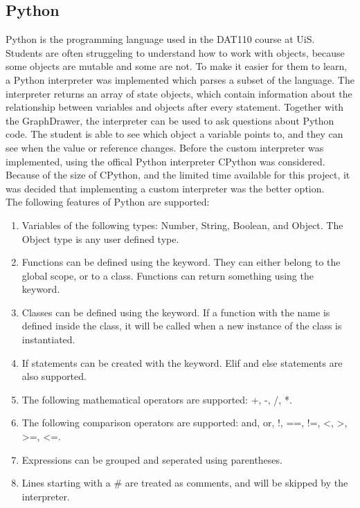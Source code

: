 \subsection{Python}
Python is the programming language used in the DAT110 course at UiS. Students are often struggeling to understand how to work with objects, because some objects are mutable and some are not. To make it easier for them to learn, a Python interpreter was implemented which parses a subset of the language. The interpreter returns an array of state objects, which contain information about the relationship between variables and objects after every statement. Together with the GraphDrawer, the interpreter can be used to ask questions about Python code. The student is able to see which object a variable points to, and they can see when the value or reference changes. Before the custom interpreter was implemented, using the offical Python interpreter CPython \cite{CPython} was considered. Because of the size of CPython, and the limited time available for this project, it was decided that implementing a custom interpreter was the better option.
\\[11pt]
The following features of Python are supported:
\begin{enumerate}
    \item Variables of the following types: Number, String, Boolean, and Object. The Object type is any user defined type.
    \item Functions can be defined using the  keyword. They can either belong to the global scope, or to a class. Functions can return something using the  keyword.
    \item Classes can be defined using the  keyword. If a function with the  name is defined inside the class, it will be called when a new instance of the class is instantiated.
    \item If statements can be created with the  keyword. Elif and else statements are also supported.
    \item The following mathematical operators are supported: +, -, /, *.
    \item The following comparison operators are supported: and, or, !, ==, !=, <, >, >=, <=.
    \item Expressions can be grouped and seperated using parentheses.
    \item Lines starting with a \# are treated as comments, and will be skipped by the interpreter.
\end{enumerate}

